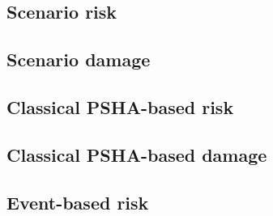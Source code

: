 \subsection{Scenario risk}
   \label{subsec:theory-sr}
   
\subsection{Scenario damage}
   \label{subsec:theory-sd}
   
\subsection{Classical PSHA-based risk}
   \label{subsec:theory-cr}
   
\subsection{Classical PSHA-based damage}
   \label{subsec:theory-cd}
   
\subsection{Event-based risk}
   \label{subsec:theory-ebr}
   
   \cleardoublepage